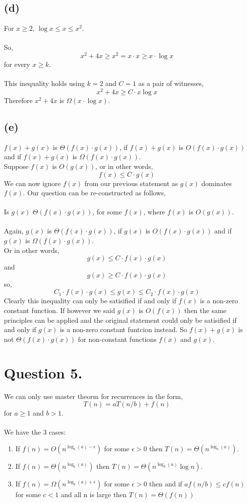 \documentclass[]{article}
\begin{document}
\subsection*{(d)}
For $x \geq 2$, $\log x \leq x \leq x^2$.
\\
\\
So,
$$x^2+4x \geq x^2 = x \cdot x \geq x \cdot \log x$$
for every $x \geq k$.
\\
\\
This inequality holds using $k = 2$ and $C = 1$ as a pair of witnesses,
$$x^2+4x \geq C \cdot x \log x$$
Therefore $x^2+4x$ is $\Omega (x \cdot \log x)$.
\subsection*{(e)}
$f(x)+g(x)$ is $\Theta (f(x) \cdot g(x))$, if $f(x)+g(x)$ is $O(f(x) \cdot g(x))$ and if $f(x)+g(x)$ is $\Omega (f(x) \cdot g(x))$.
\\
Suppose $f(x)$ is $O(g(x))$, or in other words, 
$$ f(x) \leq C \cdot g(x)$$
We can now ignore $f(x)$ from our previous statement as $g(x)$ dominates $f(x)$. Our question can be re-constructed as follows,
\\
\\
Is $g(x)$ $\Theta (f(x) \cdot g(x))$, for some $f(x)$, where $f(x)$ is $O(g(x))$.
\\
\\
Again, $g(x)$ is $\Theta (f(x) \cdot g(x))$, if $g(x)$ is $O(f(x) \cdot g(x))$ and if $g(x)$ is $\Omega (f(x) \cdot g(x))$. 
\\
Or in other words,
$$g(x) \leq C \cdot f(x) \cdot g(x) $$
and
$$g(x) \geq C \cdot f(x) \cdot g(x)$$
so,
$$C_{1} \cdot f(x) \cdot g(x) \leq g(x) \leq C_{2} \cdot f(x) \cdot g(x) $$
Clearly this inequality can only be satisified if and only if $f(x)$ is a non-zero constant function. If however we said $g(x)$ is $O(f(x))$ then the same principles can be applied and the original statement could only be satisified if and only if $g(x)$ is a non-zero constant funtcion instead. So $f(x)+g(x)$ is not $\Theta (f(x) \cdot g(x))$ for non-constant functions $f(x)$ and $g(x)$.
\section*{Question 5.}

We can only use master theorm for recurrences in the form,
\\
$$T(n) = aT(n/b)+f(n)$$
for $a \geq 1$ and $b > 1$.
\\
\\
We have the 3 cases:
\begin{enumerate}
\item If $f(n) = O(n^{\log_b (a) - \epsilon})$ for some $\epsilon > 0$ then $T(n) = \Theta (n^{\log_b (a)})$.
\item If $f(n) = \Theta (n^{\log_b (a)})$ then $T(n) =\Theta (n^{\log_b (a)} \log n)$.
\item If $f(n) = \Omega (n^{\log_b (a) + \epsilon})$ for some $\epsilon > 0$ then and if $af(n/b) \leq cf(n)$ for some $c <1$ and all n is large then $T(n) = \Theta (f(n))$
\end{enumerate}
\end{document}
